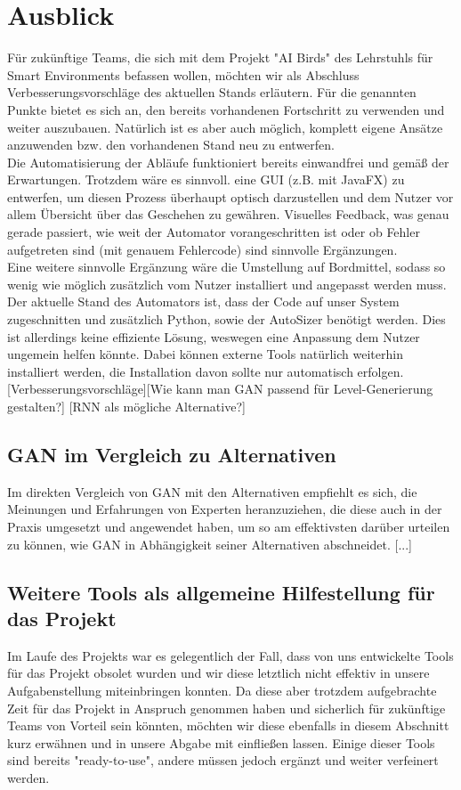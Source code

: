 \section{Ausblick}
Für zukünftige Teams, die sich mit dem Projekt "AI Birds" des Lehrstuhls für Smart Environments befassen wollen, möchten wir als Abschluss Verbesserungsvorschläge des aktuellen Stands erläutern. Für die genannten Punkte bietet es sich an, den bereits vorhandenen Fortschritt zu verwenden und weiter auszubauen. Natürlich ist es aber auch möglich, komplett eigene Ansätze anzuwenden bzw. den vorhandenen Stand neu zu entwerfen. \\ Die Automatisierung der Abläufe funktioniert bereits einwandfrei und gemäß der Erwartungen. Trotzdem wäre es sinnvoll. eine GUI (z.B. mit JavaFX) zu entwerfen, um diesen Prozess überhaupt optisch darzustellen und dem Nutzer vor allem Übersicht über das Geschehen zu gewähren. Visuelles Feedback, was genau gerade passiert, wie weit der Automator vorangeschritten ist oder ob Fehler aufgetreten sind (mit genauem Fehlercode) sind sinnvolle Ergänzungen. \\ Eine weitere sinnvolle Ergänzung wäre die Umstellung auf Bordmittel, sodass so wenig wie möglich zusätzlich vom Nutzer installiert und angepasst werden muss. Der aktuelle Stand des Automators ist, dass der Code auf unser System zugeschnitten und zusätzlich Python, sowie der AutoSizer benötigt werden. Dies ist allerdings keine effiziente Lösung, weswegen eine Anpassung dem Nutzer ungemein helfen könnte. Dabei können externe Tools natürlich weiterhin installiert werden, die Installation davon sollte nur automatisch erfolgen.
[Verbesserungsvorschläge][Wie kann man GAN passend für Level-Generierung gestalten?] [RNN als mögliche Alternative?]
\subsection{GAN im Vergleich zu Alternativen}
Im direkten Vergleich von GAN mit den Alternativen empfiehlt es sich, die Meinungen und Erfahrungen von Experten heranzuziehen, die diese auch in der Praxis umgesetzt und angewendet haben, um so am effektivsten darüber urteilen zu können, wie GAN in Abhängigkeit seiner Alternativen abschneidet. [...]
\subsection{Weitere Tools als allgemeine Hilfestellung für das Projekt}
Im Laufe des Projekts war es gelegentlich der Fall, dass von uns entwickelte Tools für das Projekt obsolet wurden und wir diese letztlich nicht effektiv in unsere Aufgabenstellung miteinbringen konnten. Da diese aber trotzdem aufgebrachte Zeit für das Projekt in Anspruch genommen haben und sicherlich für zukünftige Teams von Vorteil sein könnten, möchten wir diese ebenfalls in diesem Abschnitt kurz erwähnen und in unsere Abgabe mit einfließen lassen. Einige dieser Tools sind bereits "ready-to-use", andere müssen jedoch ergänzt und weiter verfeinert werden.
